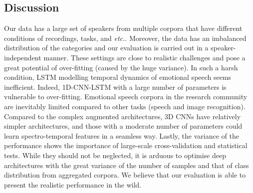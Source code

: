 \documentclass[conference, compsoc, twoside]{IEEEtran}
\newcommand{\etc}{\emph{etc.}}
\begin{document}
\subsection{Discussion}
Our data has a large set of speakers from multiple corpora that have different conditions of recordings, tasks, and \etc. Moreover, the data has an imbalanced distribution of the categories and our evaluation is carried out in a speaker-independent manner. These settings are close to realistic challenges and pose a great potential of over-fitting (caused by the huge variance). In such a harsh condition, LSTM modelling temporal dynamics of emotional speech seems inefficient. Indeed, 1D-CNN-LSTM with a large number of parameters is vulnerable to over-fitting. Emotional speech corpora in the research community are inevitably limited compared to other tasks (speech and image recognition). Compared to the complex augmented architectures, 3D CNNs have relatively simpler architectures, and those with a moderate number of parameters could learn spectro-temporal features in a seamless way. Lastly, the variance of the performance shows the importance of large-scale cross-validation and statistical tests. While they should not be neglected, it is arduous to optimise deep architectures with the great variance of the number of samples and that of class distribution from aggregated corpora. We believe that our evaluation is able to present the realistic performance in the wild.

\end{document}
